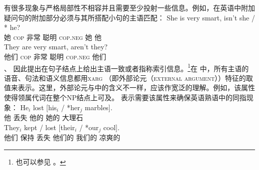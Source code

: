 有很多现象与严格局部性不相容并且需要至少投射一些信息。例如，在英语中附加疑问句的附加部分必须与其所搭配小句的主语匹配：
\eal
\ex 
\gll She is very smart, isn't she / * he?\\
     她 \textsc{cop} 非常 聪明 \textsc{cop}.\textsc{neg} 她 {} {} 他\\
\ex 
\gll They are very smart, aren't they?\\
     他们 \textsc{cop} 非常 聪明 \textsc{cop}.\textsc{neg} 他们\\
\zl
 \citet{BF99a}、 \citet{FB2003a}因此提出在句子结点上给出主语一致或者指称索引信息。\footnote{%
  也可以参见 。
}在 \citet{Sag2007a}中，所有主语的语音、句法和语义信息都用\textsc{xarg} （即外部论元（\textsc{external argument}））特征的取值来表示。这里，外部论元与\gbtc 中的含义不一样，应该作宽泛的理解。例如，该属性使得领属代词在整个NP结点上可及。 \citet{Sag2007a}表示需要该属性来确保英语熟语中的同指现象：
\eal
\ex 
\gll He$_i$ lost [his$_i$ / *her$_j$ marbles].\\
     他      丢失 \spacebr{}他的 {} 她的 大理石\\
\ex 
\gll They$_i$ kept / lost [their$_i$ / *our$_j$ cool].\\
     他们     保持  {} 丢失 \spacebr{}他们的 {} 我们的 凉爽的\\
